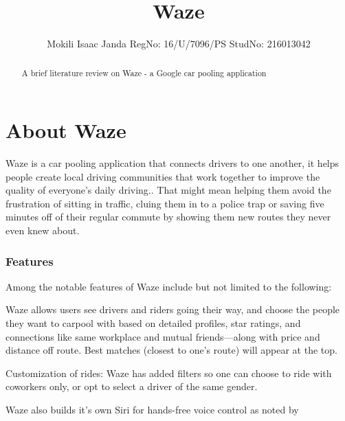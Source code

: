 \documentclass[12pt,a4paper]{article}
\author{Mokili Isaac Janda RegNo: 16/U/7096/PS StudNo: 216013042}
\title{Waze}
\begin{document}
\maketitle
\begin{abstract}
A brief literature review on Waze - a Google car pooling application
\end{abstract}
\section{About Waze}
Waze is a car pooling application that connects drivers to one another\cite{wang2014driver}, it helps people create local driving communities that work together to improve the quality of everyone's daily driving.\cite{wazeMobile}. That might mean helping them avoid the frustration of sitting in traffic\cite{sinai2014exploiting,silva2013traffic,mcclendon2013google}, cluing them in to a police trap or saving five minutes off of their regular commute by showing them new routes they never even knew about.\cite{mcclendon2013google} 

\subsubsection{Features}
Among the notable features of Waze include but not limited to the following:

Waze allows users see drivers and riders going their way, and choose the people they want to carpool with based on detailed profiles, star ratings, and connections like same workplace and mutual friends—along with price and distance off route. Best matches (closest to one's route) will appear at the top.\cite{wazeBlog}
 
Customization of rides: Waze has added filters so one can choose to ride with coworkers only, or opt to select a driver of the same gender.\cite{wazeBlog}
  
Waze also builds it's own Siri for hands-free voice control as noted by \cite{hardawar2012driving}



\end{document}
